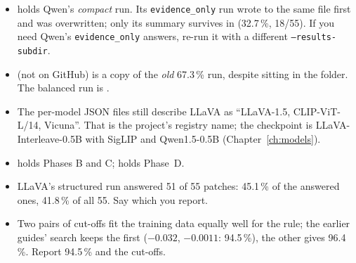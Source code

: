 \begin{itemize}
  \item {} holds Qwen's \emph{compact} run. Its \texttt{evidence\_only} run wrote to the same file first and was overwritten; only its summary survives in  (32.7\,\%, 18/55). If you need Qwen's \texttt{evidence\_only} answers, re-run it with a different \texttt{--results-subdir}.
  \item {} (not on GitHub) is a copy of the \emph{old} 67.3\,\% run, despite sitting in the  folder. The balanced run is .
  \item The per-model JSON files still describe LLaVA as ``LLaVA-1.5, CLIP-ViT-L/14, Vicuna''. That is the project's registry name; the checkpoint is LLaVA-Interleave-0.5B with SigLIP and Qwen1.5-0.5B (Chapter~\ref{ch:models}).
  \item {} holds Phases B and C;  holds Phase~D.
  \item LLaVA's structured run answered 51 of 55 patches: 45.1\,\% of the answered ones, 41.8\,\% of all 55. Say which you report.
  \item Two pairs of cut-offs fit the training data equally well for the \dndvi{} rule; the earlier guides' search keeps the first ($-0.032$, $-0.0011$: 94.5\,\%), the other gives 96.4\,\%. Report 94.5\,\% and the cut-offs.
\end{itemize}
